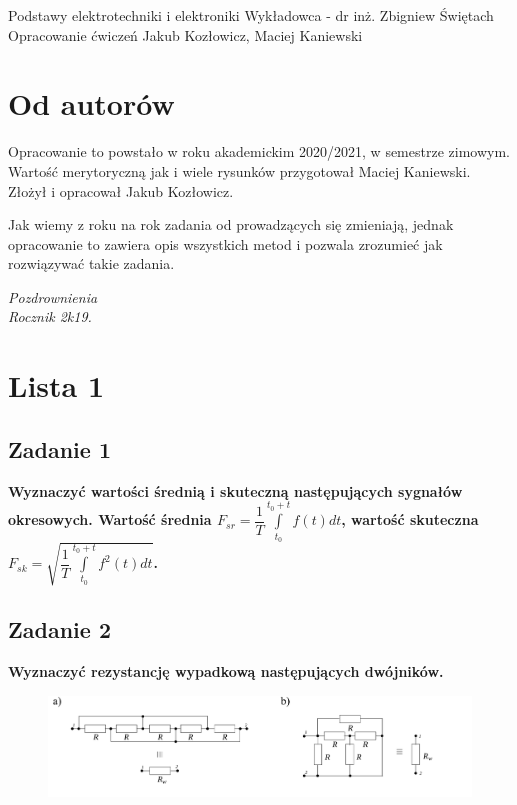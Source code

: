 \documentclass[12pt, a4paper]{article}
\begin{document}
\makeTilte
{Podstawy elektrotechniki i elektroniki}
{Wykładowca - dr inż. Zbigniew Świętach}
{Opracowanie ćwiczeń}
{Jakub Kozłowicz, Maciej Kaniewski}

\section{Od autorów}
\vspace*{2cm}
Opracowanie to powstało w roku akademickim 2020/2021, w semestrze zimowym.
Wartość merytoryczną jak i wiele rysunków przygotował Maciej Kaniewski.
Złożył i opracował Jakub Kozłowicz.

Jak wiemy z roku na rok zadania od prowadzących się zmieniają, jednak opracowanie
to zawiera opis wszystkich metod i pozwala zrozumieć jak rozwiązywać takie zadania.
\vspace*{2cm}
\begin{flushright}
  \textit{Pozdrownienia\\Rocznik 2k19.}
\end{flushright}

\section{Lista 1}
\subsection{Zadanie 1}
\textbf{Wyznaczyć wartości średnią i skuteczną następujących sygnałów okresowych.
  Wartość średnia $F_{sr} = \dfrac{1}{T}\int\limits_{t_0}^{t_0+t}f(t)dt$,
  wartość skuteczna $F_{sk} = \sqrt{\dfrac{1}{T}\int\limits_{t_0}^{t_0+t}f^2(t)dt}$.}

\subsection{Zadanie 2}
\textbf{Wyznaczyć rezystancję wypadkową następujących dwójników.}
\begin{figure}[H]
  \centering
  \includegraphics[width = \textwidth]{./images/Lista_1/Zadanie_2.png}
\end{figure}
\end{document}
